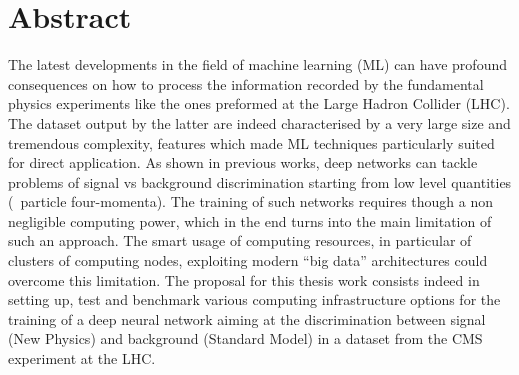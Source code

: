 \begingroup
\let\clearpage\relax
\let\cleardoublepage\relax
\let\cleardoublepage\relax

\chapter*{Abstract}
The latest developments in the field of machine learning (ML) can have profound
consequences on how to process the information recorded by the fundamental physics
experiments like the ones preformed at the Large Hadron Collider (LHC). The dataset
output by the latter are indeed characterised by a very large size and tremendous
complexity, features which made ML techniques particularly suited for direct application.
As shown in previous works, deep networks can tackle problems of signal vs background
discrimination starting from low level quantities (\eg~particle four-momenta). The
training of such networks requires though a non negligible computing power, which in the
end turns into the main limitation of such an approach. The smart usage of computing
resources, in particular of clusters of computing nodes, exploiting modern “big data”
architectures could overcome this limitation. The proposal for this thesis work consists
indeed in setting up, test and benchmark various computing infrastructure options for the
training of a deep neural network aiming at the discrimination between signal (New
Physics) and background (Standard Model) in a dataset from the CMS experiment at the LHC.

\vfill

